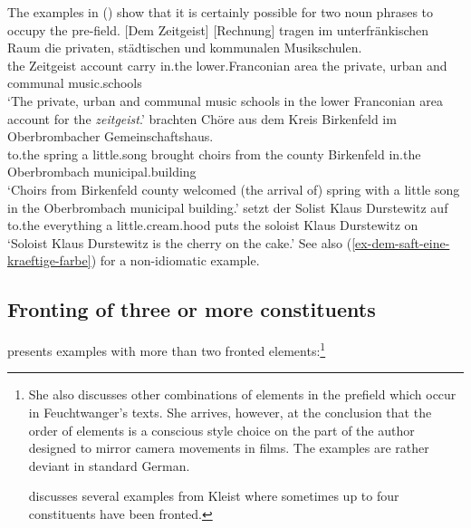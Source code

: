 The examples in () show that it is certainly possible for two noun phrases to occupy the pre-field.
\eal
\label{ex-multiple-nps-collocation-idiom}
\ex
\label{bsp-zeitgeist-zwei} 
\gll {}[Dem Zeitgeist] [Rechnung] tragen im unterfränkischen Raum die privaten, städtischen und kommunalen Musikschulen.\footnotemark\\
      \spacebr{}the Zeitgeist \spacebr{}account carry in.the lower.Franconian area the private, urban and communal music.schools\\
\glt `The private, urban and communal music schools in the lower Franconian area account for the
\emph{zeitgeist}.'
\ex
{} brachten Chöre aus dem Kreis Birkenfeld im Oberbrombacher Gemeinschaftshaus.\footnotemark\\
\hspaceThis{[}to.the spring \hspaceThis{[}a little.song brought choirs from the county Birkenfeld
    in.the Oberbrombach municipal.building\\
\glt `Choirs from Birkenfeld county welcomed (the arrival of) spring with a little song in the Oberbrombach municipal building.'\label{fruehling}
\ex
{} setzt der Solist Klaus Durstewitz auf\footnotemark\\
     \hspaceThis{[}to.the everything \hspaceThis{[}a little.cream.hood puts the soloist Klaus
         Durstewitz on\\
\glt `Soloist Klaus Durstewitz is the cherry on the cake.'\label{bsp-sahne}
\zl
See also (\ref{ex-dem-saft-eine-kraeftige-farbe}) for a non-idiomatic example.


\subsection{Fronting of three or more constituents}
\label{sec-fronting-more-than-two}

\citet[]{Luehr85a} presents examples with more than two fronted elements:\footnote{
	She also discusses other combinations of elements in the prefield which occur in Feuchtwanger's texts.
	She arrives, however, at the conclusion that the order of elements is a conscious style choice on the part
	of the author designed to mirror camera movements in films. The examples are rather deviant in standard German.

\citet{Lee75a} discusses several examples from Kleist where sometimes up to four constituents have been fronted.%
}

